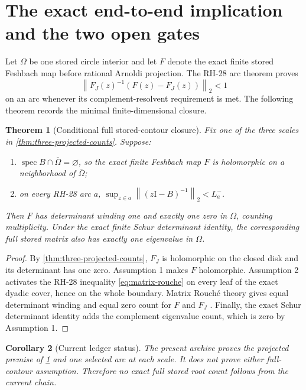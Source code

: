 \documentclass[11pt]{article}
\newtheorem{theorem}{Theorem}[section]
\newtheorem{corollary}[theorem]{Corollary}
\theoremstyle{definition}
\theoremstyle{remark}
\newcommand{\Id}{\mathrm I}
\newcommand{\norm}[1]{\left\lVert#1\right\rVert}
\newcommand{\spec}{\operatorname{spec}}
\begin{document}
\section{The exact end-to-end implication and the two open gates}
\label{sec:end-to-end}

Let $\Omega$ be one stored circle interior and let $F$ denote the exact
finite stored Feshbach map before rational Arnoldi projection.  The RH-28
arc theorem proves
\begin{equation}
 \norm{F_J(z)^{-1}(F(z)-F_J(z))}_2<1
 \label{eq:matrix-rouche}
\end{equation}
on an arc whenever its complement-resolvent requirement is met.  The
following theorem records the minimal finite-dimensional closure.

\begin{theorem}[Conditional full stored-contour closure]
\label{thm:conditional-closure}
Fix one of the three scales in \cref{thm:three-projected-counts}.  Suppose:
\begin{enumerate}
 \item $\spec B\cap\overline\Omega=\varnothing$, so the exact finite
       Feshbach map $F$ is holomorphic on a neighborhood of
       $\overline\Omega$;
 \item on every RH-28 arc $a$,
       $\sup_{z\in a}\norm{(z\Id-B)^{-1}}_2<L_a^-$.
\end{enumerate}
Then $F$ has determinant winding one and exactly one zero in $\Omega$,
counting multiplicity.  Under the exact finite Schur determinant identity,
the corresponding full stored matrix also has exactly one eigenvalue in
$\Omega$.
\end{theorem}

\begin{proof}
By \cref{thm:three-projected-counts}, $F_J$ is holomorphic on the closed
disk and its determinant has one zero.  Assumption 1 makes $F$ holomorphic.
Assumption 2 activates the RH-28 inequality
\cref{eq:matrix-rouche} on every leaf of the exact dyadic cover, hence on
the whole boundary.  Matrix Rouch\'e theory gives equal determinant winding
and equal zero count for $F$ and $F_J$ \citep{GohbergSigal1971}.  Finally,
the exact Schur determinant identity adds the complement eigenvalue count,
which is zero by Assumption 1.
\end{proof}

\begin{corollary}[Current ledger status]
\label{cor:current-status}
The present archive proves the projected premise of
\cref{thm:conditional-closure} and one selected arc at each scale.  It does
not prove either full-contour assumption.  Therefore no exact full stored
root count follows from the current chain.
\end{corollary}
\end{document}
